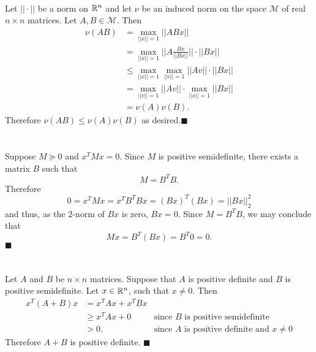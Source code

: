 \documentclass[letterpaper,12pt,oneside,onecolumn]{article}
\newcommand{\cM}{\mathcal{M}} \newcommand{\cN}{\mathcal{N}}
\begin{document}
\paragraph{}
Let $|| \cdot ||$ be a norm on $\mathbb{R}^n$ and let $\nu$ be an induced norm on the space $\cM$ of real $n \times n$ matrices. Let $A, B \in \cM$. Then
\begin{align*}
\nu(AB) &= \max_{||x|| = 1} ||ABx|| \\
&= \max_{||x|| = 1} ||A\frac{Bx}{||Bx||}||\cdot ||Bx||\\
&\leq \max_{||x|| = 1} \max_{||v|| = 1} ||Av|| \cdot ||Bx||\\
&= \max_{||v|| =1} ||Av||\cdot \max_{||x|| = 1} ||Bx|| \\
&=\nu(A) \nu(B).
\end{align*}
Therefore $\nu(AB) \leq \nu(A) \nu(B)$ as desired.$\blacksquare$

\section{}
\paragraph{}
Suppose $M \succcurlyeq 0$ and $x^TMx=0$. Since $M$ is positive semidefinite, there exists a matrix $B$ such that
$$M = B^TB.$$
Therefore $$0 = x^TMx = x^TB^TBx = (Bx)^T(Bx) = ||Bx||_2^2$$
and thus, as the $2$-norm of $Bx$ is zero, $Bx = 0$. Since $M = B^TB$, we may conclude that $$Mx = B^T(Bx) = B^T0 = 0.$$$\blacksquare$

\section{}
\subsection{}
\paragraph{}
Let $A$ and $B$ be $n \times n$ matrices. Suppose that $A$ is positive definite and $B$ is positive semidefinite. Let $x \in \mathbb{R}^n$, such that $x \neq 0$. Then
\begin{align*}
x^T(A + B)x &= x^TAx + x^TBx \\
&\geq x^TAx +0 &\text{since $B$ is positive semidefinite}\\
&> 0. &\text{since $A$ is positive definite and $x\neq 0$}\end{align*}
Therefore $A+B$ is positive definite. $\blacksquare$
\end{document}
